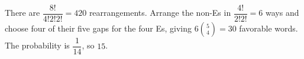There are $\dfrac{8!}{4!2!2!}=420$ rearrangements. Arrange the non-Es in $\dfrac{4!}{2!2!}=6$ ways and choose four of their five gaps for the four Es, giving $6\binom54=30$ favorable words. The probability is $\dfrac{1}{14}$, so $\boxed{15}$.
